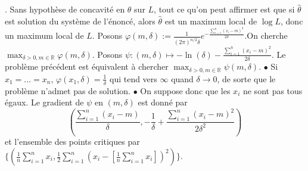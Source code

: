 \documentclass{report}
\begin{document}
\subsection{} \noindent{}\\ 
\\ 
\\
. Sans hypothèse de concavité en $\theta$ sur $L$, tout ce qu'on peut affirmer est que si $\hat \theta$ est solution du système de l'énoncé, alors $\hat \theta$ est un maximum local de $\log L$, donc un maximum local de $L$.\newline
\newline
Posons $\varphi(m,\delta):=\frac{1}{(2\pi)^{n/2}\delta}e^{-\frac{\sum_{i=1}^n (x_i-m)^2}{2\delta}}$.\newline On cherche $\displaystyle \max_{\delta >0, m \in \mathbb R} \varphi(m,\delta)$. \newline
Posons $\psi:(m,\delta)\mapsto -\ln(\delta) - \frac{\sum_{i=1}^n(x_i-m)^2}{2\delta}$. Le problème précédent est équivalent à chercher $\max_{\delta >0, m \in \mathbb R} \psi(m,\delta)$.\newline
$\bullet$ Si $x_1=\ldots=x_n$, $\varphi(x_1,\delta)=\frac{1}{\delta}$ qui tend vers $\infty$ quand $\delta \to 0$, de sorte que le problème n'admet pas de solution.
\newline
$\bullet$ On suppose donc que les $x_i$ ne sont pas tous égaux.\newline
Le gradient de $\psi$ en $(m,\delta)$ est donné par $$\left(\frac{\sum_{i=1}^n (x_i-m)}{\delta}, -\frac{1}{\delta} + \frac{\sum_{i=1}^n (x_i-m)^2}{2\delta^2}  \right)$$ et l'ensemble des points critiques par $\{(\frac{1}{n}\sum_{i=1}^n x_i, \frac{1}{2}\sum_{i=1}^n \left(x_i - \left[\frac{1}{n}\sum_{i=1}^n x_i \right]\right)^2)\}$. \newline
\end{document}
